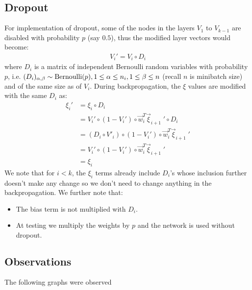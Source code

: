 \documentclass{article}
\begin{document}
\subsection{Dropout}
For implementation of dropout, some of the nodes in the layers $V_1$ to $V_{k-1}$ are disabled with probability $p$ (say $0.5$), thus the modified layer vectors would become:
\begin{gather*}
V_i'=V_i\circ D_i\tag{$i<k$}
\end{gather*}
where $D_i$ is a matrix of independent Bernoulli random variables with probability $p$, i.e. $(D_i)_{\alpha,\beta}\sim{\rm Bernoulli}(p), 1\le \alpha \le n_i, 1\le \beta \le n$ (recall $n$ is minibatch size) and of the same size as of $V_i$. During backpropagation, the $\xi$ values are modified with the same $D_i$ as:
\begin{align*}
\xi_i'&=\xi_i\circ D_i \\&= V_i' \circ (1-V_i') \circ \vec w_i^T\vec \xi_{i+1}\;'\circ D_i\\\tag{$i<k$}
&=(D_i\circ V'_i)\circ (1-V_i') \circ \vec w_i^T\vec \xi_{i+1}\;'\\
&=V_i'\circ (1-V_i') \circ \vec w_i^T\vec \xi_{i+1}\;'\\
&=\xi_i
\end{align*}
We note that for $i<k$, the $\xi_i$ terms already include $D_i$'s whose inclusion further doesn't make any change so we don't need to change anything in the backpropagation. We further note that:
\begin{itemize}
\item The bias term is not multiplied with $D_i$.
\item At testing we multiply the weights by $p$ and the network is used without dropout.
\end{itemize}
\subsection{Observations}
The following graphs were observed
\end{document}
